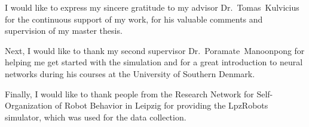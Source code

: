 
\begin{acknowledgements}

I would like to express my sincere gratitude to my advisor Dr.~\mbox{Tomas}~\mbox{Kulvicius} for the continuous support of my work, for his valuable comments and \mbox{supervision} of my master thesis.

Next, I would like to thank my second supervisor Dr.~\mbox{Poramate}~\mbox{Manoonpong} for helping me get started with the simulation and for a great introduction to neural networks during his courses at the University of Southern Denmark.

Finally, I would like to thank people from the Research Network for Self-Organization of Robot Behavior in Leipzig for providing the LpzRobots \mbox{simulator}, which was used for the data collection.

\end{acknowledgements}